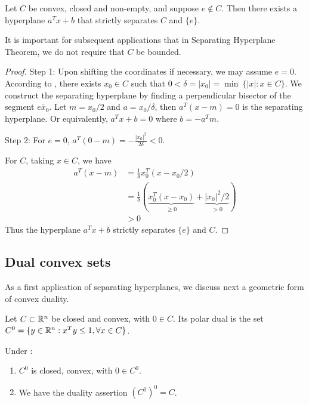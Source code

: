 \begin{theorem}
Let $C$ be convex, closed and non-empty, and suppose $e \notin C$.
Then there exists a hyperplane $a^T x + b$ that strictly separates $C$ and $\{ e \}$.
\end{theorem}

\begin{remark}
It is important for subsequent applications that in Separating Hyperplane Theorem, we do not require that $C$ be bounded.
\end{remark}

\begin{proof}
Step 1:
Upon shifting the coordinates if necessary, we may assume $e = 0$.
According to , there exists $x_0 \in C$ such that $0 < \delta = |x_0| = \min \ \{ |x| : x \in C \}$.
We construct the separating hyperplane by finding a perpendicular bisector of the segment $\overline{e x_0}$.
Let $m = x_0 / 2$ and $a = x_0 / \delta$, then $a^T (x - m) = 0$ is the separating hyperplane.
Or equivalently, $a^T x + b = 0$ where $b = -a^T m$.

Step 2:
For $e=0$, $a^T (0 - m) = -\frac{|x_0|^2}{2 \delta} < 0$.

For $C$, taking $x \in C$, we have
\begin{align}
a^T (x-m) 
& = \frac{1}{\delta} x_0^T (x- x_0/2) \\
& = \frac{1}{\delta} \left( \underbrace{x_0^T (x- x_0)}_{\ge 0} + \underbrace{|x_0|^2/2}_{>0} \right) \\
& > 0
\end{align}
Thus the hyperplane $a^T x + b$ strictly separates $\{ e \}$ and $C$.
\end{proof}

\subsection{Dual convex sets}

As a first application of separating hyperplanes, we discuss next a geometric form of convex duality.

\begin{definition}
Let $C \subset \mathbb{R}^n$ be closed and convex, with $0 \in C$.
Its polar dual is the set $C^0 = \{ y \in \mathbb{R}^n: x^T y \le 1, \forall x \in C \}$.
\end{definition}

\begin{theorem}
Under :
\begin{enumerate}
    \item $C^0$ is closed, convex, with $0 \in C^0$.
    \item We have the duality assertion $(C^0)^0 = C$.
\end{enumerate}
\end{theorem}

